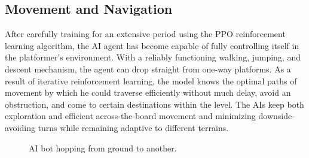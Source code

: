 \documentclass[12pt,oneside,openright,a4paper]{cpe-english-project}
\begin{document}
\subsection{Movement and Navigation}
After carefully training for an extensive period using the PPO reinforcement learning algorithm, the AI agent has become capable of fully controlling itself in the platformer's environment. With a reliably functioning walking, jumping, and descent mechanism, the agent can drop straight from one-way platforms. As a result of iterative reinforcement learning, the model knows the optimal paths of movement by which he could traverse efficiently without much delay, avoid an obstruction, and come to certain destinations within the level. The AIs keep both exploration and efficient across-the-board movement and minimizing downside-avoiding turns while remaining adaptive to different terrains.
\begin{figure}[!h]
\centering
{}
\caption{AI bot hopping from ground to another.}\label{fig:AIJump}
\end{figure}
\newpage
\end{document}
